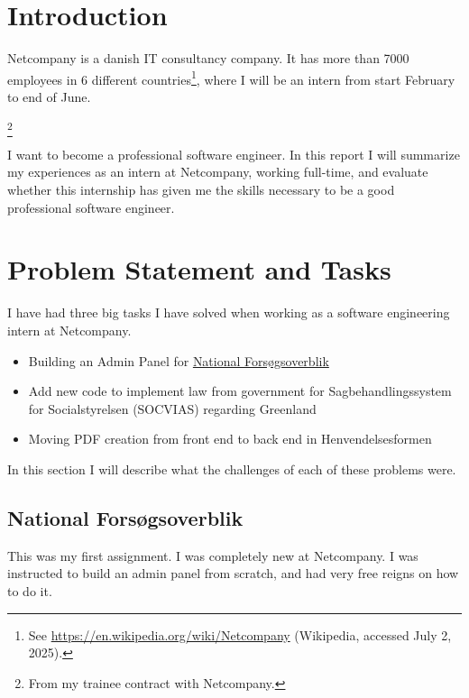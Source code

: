 \documentclass[../main.tex]{subfiles}
\begin{document}
\section{Introduction}

Netcompany is a danish IT consultancy company. It has more than 7000 employees in 6 different countries\footnote{See \url{https://en.wikipedia.org/wiki/Netcompany} (Wikipedia, accessed July 2, 2025).}, where I will be an intern from start February to end of June.

\footnote{From my trainee contract with Netcompany.}

I want to become a professional software engineer. In this report I will summarize my experiences as an intern at Netcompany, working full-time, and evaluate whether this internship has given me the skills necessary to be a good professional software engineer.



\section{Problem Statement and Tasks}

I have had three big tasks I have solved when working as a software engineering intern at Netcompany. 

\begin{itemize}
    \item Building an Admin Panel for \href{https://nationaltforsoegsoverblik.dk/}{National Forsøgsoverblik} 
    \item Add new code to implement law from government for Sagbehandlingssystem for Socialstyrelsen (SOCVIAS) regarding Greenland
    \item Moving PDF creation from front end to back end in Henvendelsesformen
\end{itemize}

In this section I will describe what the challenges of each of these problems were. 

\subsection{National Forsøgsoverblik}

This was my first assignment. I was completely new at Netcompany. I was instructed to build an admin panel from scratch, and had very free reigns on how to do it. 
\end{document}
